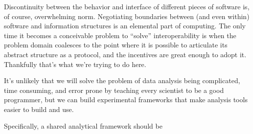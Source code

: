 \documentclass[10pt]{article}
\begin{document}
\begin{multicols}{2}
Discontinuity between the behavior and interface of different pieces of
software is, of course, overwhelming norm. Negotiating boundaries
between (and even within) software and information structures is an
elemental part of computing. The only time it becomes a conceivable
problem to ``solve'' interoperability is when the problem domain
coalesces to the point where it is possible to articulate its abstract
structure as a protocol, and the incentives are great enough to adopt
it. Thankfully that's what we're trying to do here.

It's unlikely that we will solve the problem of data analysis being
complicated, time consuming, and error prone by teaching every scientist
to be a good programmer, but we can build experimental frameworks that
make analysis tools easier to build and use.

Specifically, a shared analytical framework should be

\begin{itemize}


\end{itemize}
\end{multicols}
\end{document}
